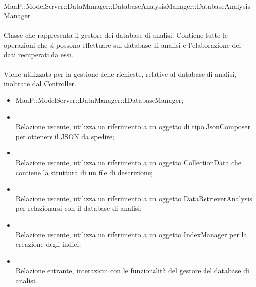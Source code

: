 \\
MaaP::ModelServer::DataManager::DatabaseAnalysisManager::DatabaseAnalysisManager\\
\\
Classe che rappresenta il gestore dei database di analisi. Contiene tutte le operazioni che si possono effettuare sul database di analisi e l'elaborazione dei dati recuperati da essi.\\
\\
Viene utilizzata per la gestione delle richieste, relative al database di analisi, inoltrate dal Controller.
\begin{itemize}
\item MaaP::ModelServer::DataManager::IDatabaseManager;
\end{itemize}
\begin{itemize}
\item{}\\
Relazione uscente, utilizza un riferimento a un oggetto di tipo JsonComposer per ottenere il JSON da spedire;
\item{}\\
Relazione uscente, utilizza un riferimento a un oggetto CollectionData che contiene la struttura di un file di descrizione;
\item{}\\
Relazione uscente, utilizza un riferimento a un oggetto DataRetrieverAnalysis per relazionarsi con il database di analisi;
\item{}\\
Relazione uscente, utilizza un riferimento a un oggetto IndexManager per la creazione degli indici;
\item{}\\
Relazione entrante, interazioni con le funzionalità del gestore del database di analisi.
\end{itemize}

